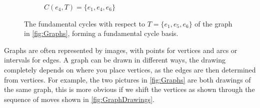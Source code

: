 \documentclass[12pt]{report}
\theoremstyle{definition}
\theoremstyle{upright}
\begin{document}
\begin{figure}[htbp]

    \ContinuedFloat

    \begin{center}
        
        \begin{subfigure}[b]{0.45\linewidth}

            \begin{center}
            

            \end{center}

            \caption{$C(e_4, T)=\{e_1, e_4, e_6\}$}
    
        \end{subfigure}

    \end{center}

    \caption{The fundamental cycles with respect to $T=\{e_1, e_5, e_6\}$ of the graph in \cref{fig:Graphs}, forming a fundamental cycle basis.}\label{fig:FundamentalCycleBasis}

\end{figure}

Graphs are often represented by images, with points for vertices and arcs or intervals for edges.
A graph can be drawn in different ways, the drawing completely depends on where you place vertices, as the edges are then determined from vertices.
For example, the two pictures in \cref{fig:Graphs} are both drawings of the same graph, this is more obvious if we shift the vertices as shown through the sequence of moves shown in \cref{fig:GraphDrawings}.
\end{document}
